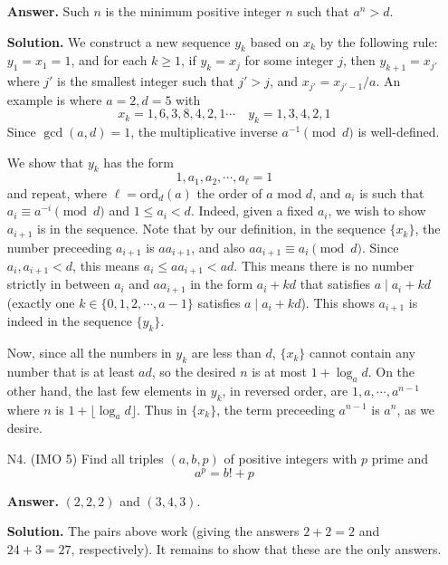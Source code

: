 \documentclass[11pt,a4paper]{article}
\begin{document}
\begin{enumerate}
        \textbf{Answer.} Such $n$ is the minimum positive integer $n$ such that $a^n > d$. 
        
        \textbf{Solution.} 
        We construct a new sequence $y_k$ based on $x_k$ by the following rule: 
        $y_1=x_1=1$, and for each $k\ge 1$, if $y_k=x_j$ for some integer $j$, 
        then $y_{k+1}=x_{j'}$ where $j'$ is the smallest integer such that $j'>j$, 
        and $x_{j'} = x_{j'-1} / a$. 
        An example is where $a=2, d=5$ with 
        \[
        x_k = 1, 6, 3, 8, 4, 2, 1\cdots
        \quad 
        y_k = 1, 3, 4, 2, 1
        \]
        Since $\gcd(a, d)=1$, the multiplicative inverse $a^{-1}\pmod{d}$ is well-defined. 
        
        We show that $y_k$ has the form 
        \[
        1, a_1, a_2, \cdots, a_{\ell}=1
        \]
        and repeat, 
        where $\ell=\text{ord}_d(a)$ the order of $a$ mod $d$, 
        and $a_i$ is such that $a_i\equiv a^{-i}\pmod{d}$ and $1\le a_i < d$. 
        Indeed, given a fixed $a_i$, we wish to show $a_{i+1}$ is in the sequence. 
        Note that by our definition, in the sequence $\{x_k\}$, the number preceeding $a_{i + 1}$ is $aa_{i+1}$, 
        and also $aa_{i+1} \equiv a_i\pmod{d}$. 
        Since $a_i, a_{i+1} < d$, this means $a_i \le aa_{i+1} < ad$. 
        This means there is no number strictly in between $a_i$ and $aa_{i+1}$ in the form $a_i + kd$ that satisfies $a\mid a_i + kd$ 
        (exactly one $k\in \{0, 1, 2, \cdots, a - 1\}$ satisfies $a\mid a_i + kd$). 
        This shows $a_{i+1}$ is indeed in the sequence $\{y_k\}$. 
        
        Now, since all the numbers in $y_k$ are less than $d$, 
        $\{x_k\}$ cannot contain any number that is at least $ad$, 
        so the desired $n$ is at most $1 + \log_a d$. 
        On the other hand, the last few elements in $y_k$, in reversed order, 
        are $1, a, \cdots, a^{n-1}$ where $n$ is $1 + \lfloor \log_a d\rfloor$. 
        Thus in $\{x_k\}$, the term preceeding $a^{n-1}$ is $a^n$, 
        as we desire. 
    	
    	\item [N4.]
    	(IMO 5)
    	Find all triples $(a,b,p)$ of positive integers with $p$ prime and$$a^p=b!+p$$
    	
    	\textbf{Answer.} $(2, 2, 2)$ and $(3, 4, 3)$. 
    	
    	\textbf{Solution.} The pairs above work (giving the answers $2+2=2$ and $24+3=27$, respectively). 
    	It remains to show that these are the only answers. 
    	

\end{enumerate}
\end{document}
